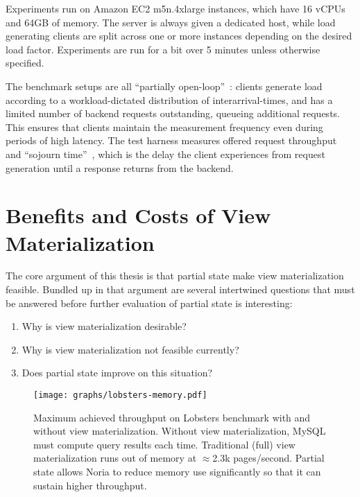 Experiments run on Amazon EC2 m5n.4xlarge instances, which have 16 vCPUs and
64GB of memory. The server is always given a dedicated host, while load
generating clients are split across one or more instances depending on the
desired load factor. Experiments are run for a bit over 5 minutes unless
otherwise specified.

The benchmark setups are all ``partially open-loop''~\cite{frank-open-loop}:
clients generate load according to a workload-dictated distribution of
interarrival-times, and has a limited number of backend requests outstanding,
queueing additional requests. This ensures that clients maintain the measurement
frequency even during periods of high latency. The test harness measures offered
request throughput and ``sojourn time''~\cite{open-loop-cautionary-tale}, which
is the delay the client experiences from request generation until a response
returns from the backend.


\section{Benefits and Costs of View Materialization}
\label{s:eval:why}

The core argument of this thesis is that partial state make view materialization
feasible. Bundled up in that argument are several intertwined questions that
must be answered before further evaluation of partial state is interesting:

\begin{enumerate}
    \item Why is view materialization desirable?
    \item Why is view materialization not feasible currently?
    \item Does partial state improve on this situation?
\end{enumerate}

\begin{figure}[h]
  \centering
  \texttt{[image: graphs/lobsters-memory.pdf]}
  \caption{Maximum achieved throughput on Lobsters benchmark with and without
  view materialization. Without view materialization, MySQL must compute query
  results each time. Traditional (full) view materialization runs out of memory
  at $\approx$2.3k pages/second. Partial state allows Noria to reduce memory use
  significantly so that it can sustain higher throughput.}
  \label{f:lobsters-memory}
\end{figure}

